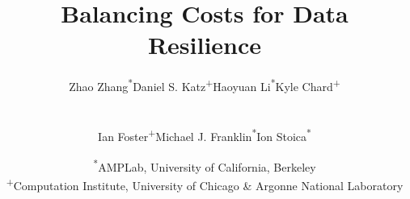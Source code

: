 \documentclass{sig-alternate}
\begin{document}

\title{Balancing Costs for Data Resilience}

\author{
\begin{tabular}{cccc}
{Zhao Zhang\textsuperscript{*}} & {Daniel S. Katz\textsuperscript{+}} & {Haoyuan Li\textsuperscript{*}} & {Kyle Chard\textsuperscript{+}} 
\end{tabular}
\\
\begin{tabular}{ccc}
{Ian Foster\textsuperscript{+}} & {Michael J. Franklin\textsuperscript{*}} & {Ion Stoica\textsuperscript{*}}
\end{tabular}
\and %
\begin{tabular}{c}
\textsuperscript{*}AMPLab, University of California, Berkeley \\
\textsuperscript{+}Computation Institute, University of Chicago \& Argonne National Laboratory
\end{tabular}
} 

\maketitle

\end{document}
